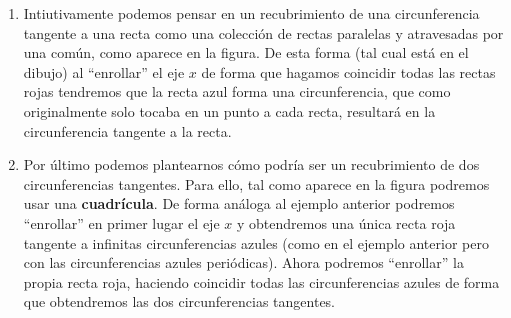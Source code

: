 \begin{ejemplo}
\begin{enumerate}
\begin{figure}[H]
%
        \end{figure}%

        \item Intiutivamente podemos pensar en un recubrimiento de una circunferencia tangente a una recta como una colección de rectas paralelas y atravesadas por una común, como aparece en la figura. De esta forma (tal cual está en el dibujo) al ``enrollar'' el eje $x$ de forma que hagamos coincidir todas las rectas rojas tendremos que la recta azul forma una circunferencia, que como originalmente solo tocaba en un punto a cada recta, resultará en la circunferencia tangente a la recta.
        
        \begin{figure}[H]
            \centering
        \end{figure}%
            
        \item Por último podemos plantearnos cómo podría ser un recubrimiento de dos circunferencias tangentes. Para ello, tal como aparece en la figura podremos usar una \textbf{cuadrícula}. De forma análoga al ejemplo anterior podremos ``enrollar'' en primer lugar el eje $x$ y obtendremos una única recta roja tangente a infinitas circunferencias azules (como en el ejemplo anterior pero con las circunferencias azules periódicas). Ahora podremos ``enrollar'' la propia recta roja, haciendo coincidir todas las circunferencias azules de forma que obtendremos las dos circunferencias tangentes.
        

\end{enumerate}
\end{ejemplo}
